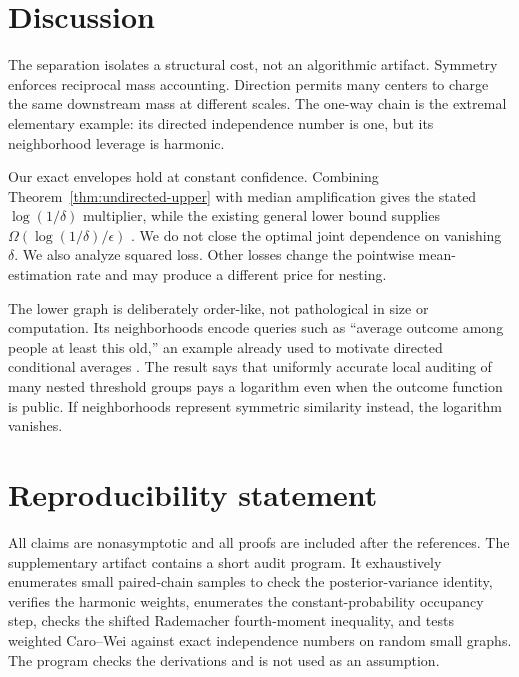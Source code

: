 \documentclass{article}
\newcommand{\1}{\mathbf 1}
\begin{document}
\section{Discussion}

The separation isolates a structural cost, not an algorithmic artifact. Symmetry enforces reciprocal mass accounting. Direction permits many centers to charge the same downstream mass at different scales. The one-way chain is the extremal elementary example: its directed independence number is one, but its neighborhood leverage is harmonic.

Our exact envelopes hold at constant confidence. Combining Theorem~\ref{thm:undirected-upper} with median amplification gives the stated $\log(1/\delta)$ multiplier, while the existing general lower bound supplies $\Omega(\log(1/\delta)/\epsilon)$ \citep{bressan2026}. We do not close the optimal joint dependence on vanishing $\delta$. We also analyze squared loss. Other losses change the pointwise mean-estimation rate and may produce a different price for nesting.

The lower graph is deliberately order-like, not pathological in size or computation. Its neighborhoods encode queries such as ``average outcome among people at least this old,'' an example already used to motivate directed conditional averages \citep{bressan2026}. The result says that uniformly accurate local auditing of many nested threshold groups pays a logarithm even when the outcome function is public. If neighborhoods represent symmetric similarity instead, the logarithm vanishes.

\section*{Reproducibility statement}

All claims are nonasymptotic and all proofs are included after the references. The supplementary artifact contains a short audit program. It exhaustively enumerates small paired-chain samples to check the posterior-variance identity, verifies the harmonic weights, enumerates the constant-probability occupancy step, checks the shifted Rademacher fourth-moment inequality, and tests weighted Caro--Wei against exact independence numbers on random small graphs. The program checks the derivations and is not used as an assumption.




\appendix

\end{document}
